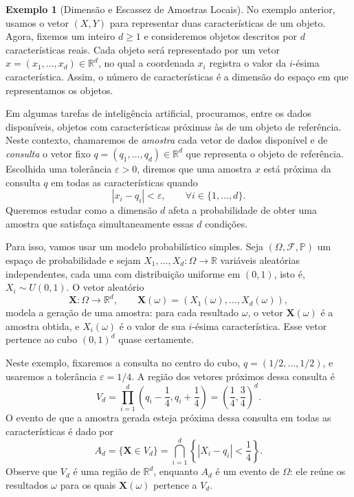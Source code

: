 \documentclass[12pt,portuguese]{article}
\theoremstyle{definition}
\newtheorem{example}[example]{Exemplo}
\theoremstyle{plainexercise}
\theoremstyle{starredexercise}
\theoremstyle{definition}
\begin{document}
\begin{example}[Dimensão e Escassez de Amostras Locais]\label{ex:dimensao-amostras-locais}
  No exemplo anterior, usamos o vetor $(X,Y)$ para representar duas
  características de um objeto. Agora, fixemos um inteiro $d\geqslant1$ e
  consideremos objetos descritos por $d$ características reais. Cada objeto
  será representado por um vetor $x=(x_1,\ldots,x_d)\in\mathbb{R}^d$, no qual
  a coordenada $x_i$ registra o valor da $i$-ésima característica. Assim, o
  número de características é a dimensão do espaço em que representamos os
  objetos.

  Em algumas tarefas de inteligência artificial, procuramos, entre os dados
  disponíveis, objetos com características próximas às de um objeto de
  referência. Neste contexto, chamaremos de \emph{amostra} cada vetor de dados
  disponível e de \emph{consulta} o vetor fixo
  $q=(q_1,\ldots,q_d)\in\mathbb{R}^d$ que representa o objeto de referência.
  Escolhida uma tolerância $\varepsilon>0$, diremos que uma amostra $x$ está
  próxima da consulta $q$ em todas as características quando
  \[
    |x_i-q_i|<\varepsilon,\qquad\forall i\in\{1,\ldots,d\}.
  \]
  Queremos estudar como a dimensão $d$ afeta a probabilidade de obter uma
  amostra que satisfaça simultaneamente essas $d$ condições.

  Para isso, vamos usar um modelo probabilístico simples. Seja
  $(\Omega,\mathcal{F},\mathbb{P})$ um espaço de probabilidade e sejam
  $X_1,\ldots,X_d:\Omega\to\mathbb{R}$ variáveis aleatórias independentes,
  cada uma com distribuição uniforme em $(0,1)$, isto é, $X_i\sim U(0,1)$. O vetor aleatório
  \[
    \mathbf{X}:\Omega\to\mathbb{R}^d,
    \qquad \mathbf{X}(\omega)=(X_1(\omega),\ldots,X_d(\omega)),
  \]
  modela a geração de uma amostra: para cada resultado $\omega$, o vetor
  $\mathbf{X}(\omega)$ é a amostra obtida, e $X_i(\omega)$ é o valor de sua
  $i$-ésima característica. Esse vetor pertence ao cubo $(0,1)^d$ quase
  certamente.

  Neste exemplo, fixaremos a consulta no centro do cubo,
  $q=(1/2,\ldots,1/2)$, e usaremos a tolerância $\varepsilon=1/4$.
  A região dos vetores próximos dessa consulta é
  \[
    V_d=\prod_{i=1}^{d}\left(q_i-\frac14,q_i+\frac14\right)
    =\left(\frac14,\frac34\right)^d.
  \]
  O evento de que a amostra gerada esteja próxima dessa consulta em todas
  as características é dado por
  \[
    A_d=\{\mathbf{X}\in V_d\}
    =\bigcap_{i=1}^{d}\left\{|X_i-q_i|<\frac14\right\}.
  \]
  Observe que $V_d$ é uma região de $\mathbb{R}^d$, enquanto $A_d$ é um
  evento de $\Omega$: ele reúne os resultados $\omega$ para os quais
  $\mathbf{X}(\omega)$ pertence a $V_d$.


\end{example}
\end{document}
